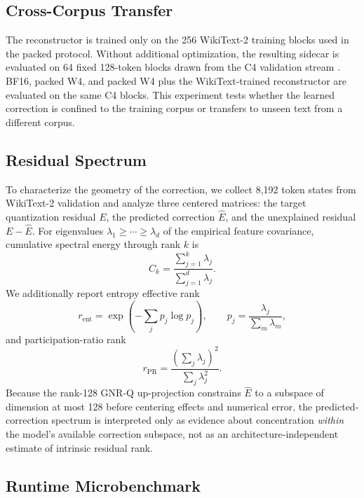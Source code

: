 \documentclass[11pt]{article}
\begin{document}
\subsection{Cross-Corpus Transfer}

The reconstructor is trained only on the 256 WikiText-2 training blocks used in the packed protocol. Without additional optimization, the resulting sidecar is evaluated on 64 fixed 128-token blocks drawn from the C4 validation stream \cite{raffel2020t5}. BF16, packed W4, and packed W4 plus the WikiText-trained reconstructor are evaluated on the same C4 blocks. This experiment tests whether the learned correction is confined to the training corpus or transfers to unseen text from a different corpus.

\subsection{Residual Spectrum}

To characterize the geometry of the correction, we collect 8,192 token states from WikiText-2 validation and analyze three centered matrices: the target quantization residual $E$, the predicted correction $\hat E$, and the unexplained residual $E-\hat E$. For eigenvalues $\lambda_1\geq\cdots\geq\lambda_d$ of the empirical feature covariance, cumulative spectral energy through rank $k$ is
\begin{equation}
 C_k =
 \frac{\sum_{j=1}^{k}\lambda_j}
 {\sum_{j=1}^{d}\lambda_j}.
\end{equation}
We additionally report entropy effective rank
\begin{equation}
 r_{\mathrm{ent}}
 =
 \exp\left(
 -\sum_j p_j\log p_j
 \right),
 \qquad
 p_j=\frac{\lambda_j}{\sum_m\lambda_m},
\end{equation}
and participation-ratio rank
\begin{equation}
 r_{\mathrm{PR}}
 =
 \frac{(\sum_j\lambda_j)^2}
 {\sum_j\lambda_j^2}.
\end{equation}
Because the rank-128 GNR-Q up-projection constrains $\hat E$ to a subspace of dimension at most 128 before centering effects and numerical error, the predicted-correction spectrum is interpreted only as evidence about concentration \emph{within} the model's available correction subspace, not as an architecture-independent estimate of intrinsic residual rank.

\subsection{Runtime Microbenchmark}
\end{document}
